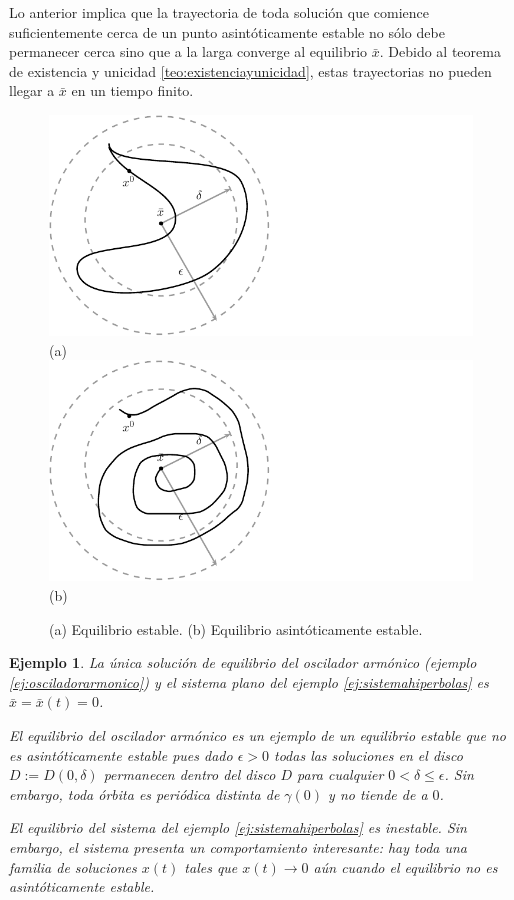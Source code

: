 \documentclass[11pt]{book}
\theoremstyle{definition}
\numberwithin{definition}{section}
\theoremstyle{theorem}
\numberwithin{theorem}{section}
\numberwithin{lemma}{section}
\numberwithin{corollary}{section}
\theoremstyle{plain}
\newtheorem{example}{Ejemplo}
\numberwithin{example}{section}
\begin{document}
Lo anterior implica que la trayectoria de toda solución que comience suficientemente cerca de un punto asintóticamente estable no sólo debe permanecer cerca sino que a la larga converge al equilibrio $\bar{x}$. Debido al teorema de existencia y unicidad \ref{teo:existenciayunicidad}, estas trayectorias no pueden llegar a $\bar{x}$ en un tiempo finito.

\begin{figure}[!ht] \centering
	\includegraphics[scale=1.0]{figures/equilibrium-stable.pdf}\\(a) \\
	\includegraphics[scale=1.0]{figures/equilibrium-asymptoticallystable.pdf}\\(b) \\
	\caption{(a) Equilibrio estable. (b) Equilibrio asintóticamente estable.}
\end{figure}

\begin{example}
La única solución de equilibrio del oscilador armónico (ejemplo \ref{ej:osciladorarmonico}) y el sistema plano del ejemplo \ref{ej:sistemahiperbolas} es $\bar{x} = \bar{x}(t) = 0$.

El equilibrio del oscilador armónico es un ejemplo de un equilibrio estable que no es asintóticamente estable pues dado $\epsilon > 0$ todas las soluciones en el disco $D := D(0, \delta)$ permanecen dentro del disco $D$ para cualquier $0 < \delta \leq \epsilon$. Sin embargo, toda órbita es periódica distinta de $\gamma(0)$ y no tiende de a $0$.

El equilibrio del sistema del ejemplo \ref{ej:sistemahiperbolas} es inestable. Sin embargo, el sistema presenta un comportamiento interesante: hay toda una familia de soluciones $x(t)$ tales que $x(t) \to 0$ aún cuando el equilibrio no es asintóticamente estable.

\end{example}
\end{document}
